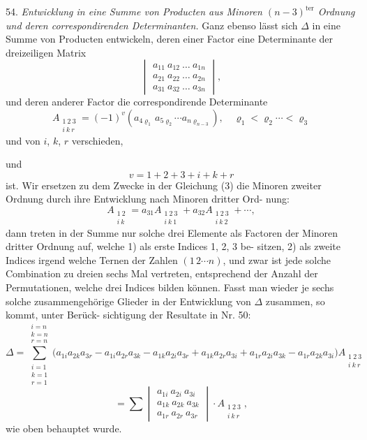 54. \textit{Entwicklung in eine Summe von Producten aus Minoren $(n-3)^{\text{ter}}$
Ordnung und deren correspondirenden Determinanten.} Ganz ebenso lässt
sich $\Delta$ in eine Summe von Producten entwickeln, deren einer Factor
eine Determinante der dreizeiligen Matrix
\[
\begin{vmatrix}
a_{11}\ a_{12}\ \ldots\ a_{1n} \\
a_{21}\ a_{22}\ \ldots\ a_{2n} \\
a_{31}\ a_{32}\ \ldots\ a_{3n}
\end{vmatrix},
\]
und deren anderer Factor die correspondirende Determinante
\[
A_{\substack{1\ 2\ 3\\ i\ k\ r}} = (-1)^{v}\left(a_{4\varrho_1}\, a_{5\varrho_2}\cdots a_{n\varrho_{n-3}}\right), \quad \varrho_1 < \varrho_2 \cdots < \varrho_3
\]
und von $i$, $k$, $r$ verschieden,

und
\[
v = 1+2+3+i+k+r
\]
ist. Wir ersetzen zu dem Zwecke in der Gleichung (3) die Minoren
zweiter Ordnung durch ihre Entwicklung nach Minoren dritter Ord-
nung:
\[
A_{\substack{1\ 2\\ i\ k}} = a_{31}A_{\substack{1\ 2\ 3\\ i\ k\ 1}} + a_{32}A_{\substack{1\ 2\ 3\\ i\ k\ 2}} + \cdots,
\]
dann treten in der Summe nur solche drei Elemente als Factoren der
Minoren dritter Ordnung auf, welche 1) als erste Indices 1, 2, 3 be-
sitzen, 2) als zweite Indices irgend welche Ternen der Zahlen $(1\,2\cdots n)$,
und zwar ist jede solche Combination zu dreien sechs Mal vertreten,
entsprechend der Anzahl der Permutationen, welche drei Indices bilden
können. Fasst man wieder je sechs solche zusammengehörige Glieder
in der Entwicklung von $\Delta$ zusammen, so kommt, unter Berück-
sichtigung der Resultate in Nr. 50:
\[
\Delta = \sum_{\substack{i=1\\ k=1\\ r=1}}^{\substack{i=n\\ k=n\\ r=n}} \bigl(a_{1i}a_{2k}a_{3r} - a_{1i}a_{2r}a_{3k} - a_{1k}a_{2i}a_{3r} + a_{1k}a_{2r}a_{3i} %
+ a_{1r}a_{2i}a_{3k} - a_{1r}a_{2k}a_{3i}\bigr)A_{\substack{1\ 2\ 3\\ i\ k\ r}}
\]
\[
= \sum \begin{vmatrix} a_{1i}\ a_{2i}\ a_{3i} \\ a_{1k}\ a_{2k}\ a_{3k} \\ a_{1r}\ a_{2r}\ a_{3r} \end{vmatrix} \cdot A_{\substack{1\ 2\ 3\\ i\ k\ r}},
\]
wie oben behauptet wurde.

